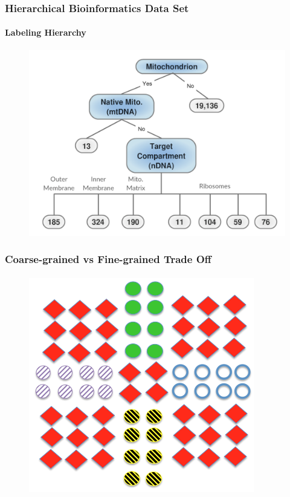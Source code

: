 \documentclass{beamer}
\begin{document}
\begin{frame}
\begin{table}[H]
{\begin{tabular}{|c|c|c|}
      \end{tabular} }
    \end{table}
\end{frame}
\begin{frame}
    \frametitle{Hierarchical Bioinformatics Data Set}  %
    \framesubtitle{Labeling Hierarchy}
    \begin{figure}[!htb]
        \centering
    \includegraphics[width=0.75\columnwidth]{fig/MitoTreeLabels}
        \label{fig:Mitotree}
    \end{figure}
\end{frame}
\begin{frame}
    \frametitle{Coarse-grained vs Fine-grained Trade Off}  %
    \framesubtitle{}
    \begin{figure}[!htb]
	\centering
    \includegraphics[width=0.6\columnwidth]{fig/union}
    \label{fig:union}
\end{figure}
\end{frame}
\end{document}
